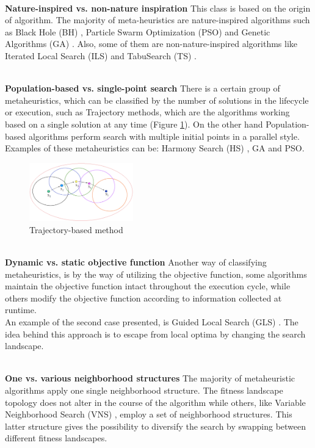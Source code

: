 ~\\
\textbf{Nature-inspired vs. non-nature inspiration }
This class is based on the origin of algorithm. The majority of meta-heuristics are nature-inspired algorithms such as Black Hole (BH) \cite{Rubio2016}, Particle Swarm Optimization (PSO) \cite{Duran:2010:CPS:1645454.1645859} and Genetic Algorithms (GA) \cite{DBLP:conf/icsi/CrawfordSPJPO14}. Also, some of them are non-nature-inspired algorithms like Iterated Local Search (ILS) \cite{DBLP:journals/networks/AringhieriGHS16} and TabuSearch (TS) \cite{DBLP:journals/eswa/SotoCGMP13}.

~\\
\textbf{Population-based vs. single-point search}
There is a certain group of metaheuristics, which can be classified by the number of solutions in the lifecycle or execution, such as Trajectory methods, which are the algorithms working based on a single solution at any time (Figure \ref{fig:trajectory-method}). On the other hand Population-based algorithms perform search with multiple initial points in a parallel style. Examples of these metaheuristics can be: Harmony Search (HS) \cite{DBLP:conf/ccece/Al-AjmiE14}, GA \cite{Aupetit2008} and PSO. 

\squeezeup
\begin{figure}[ht]
	\centering
  \includegraphics[width=0.4\textwidth]{MarcoTeorico/imagenes/trajectory-mh.png}
	\caption{Trajectory-based method}\label{fig:trajectory-method}
\end{figure}
\squeezeup

~\\
\textbf{Dynamic vs. static objective function}
Another way of classifying metaheuristics, is by the way of utilizing the objective function, some algorithms maintain the objective function intact throughout the execution cycle, while others modify the objective function according to information collected at runtime.\\
An example of the second case presented, is Guided Local Search (GLS) \cite{DBLP:journals/eor/VansteenwegenSBO09}.  The idea behind this approach is to escape from local optima by changing the search landscape. 

~\\
\textbf{One vs. various neighborhood structures}
The majority of metaheuristic algorithms apply one single neighborhood structure. The fitness landscape topology does not alter in the course of the algorithm while others, like Variable Neighborhood Search (VNS) \cite{DBLP:journals/anor/SarasolaDSA16}, employ a set of neighborhood structures. This latter structure gives the possibility to diversify the search by swapping between different fitness landscapes.

